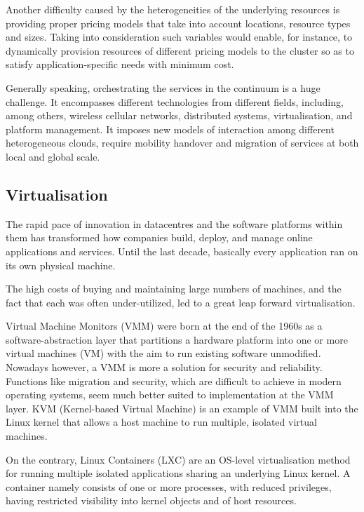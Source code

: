Another difficulty caused by the heterogeneities of the underlying resources is providing proper pricing models that take into account locations, resource types and sizes. Taking into consideration such variables would enable, for instance, to dynamically provision resources of different pricing models to the cluster so as to satisfy application-specific needs with minimum cost.

Generally speaking, orchestrating the services in the continuum is a huge challenge. It encompasses different technologies from different fields, including, among others, wireless cellular networks, distributed systems, virtualisation, and platform management. It imposes new models of interaction among different heterogeneous clouds, require mobility handover and migration of services at both local and global scale.

\subsection{Virtualisation}
\label{sec:virtualisation}

The rapid pace of innovation in datacentres and the software platforms within them has transformed how companies build, deploy, and manage online applications and services. Until the last decade, basically every application ran on its own physical machine.

The high costs of buying and maintaining large numbers of machines, and the fact that each was often under-utilized, led to a great leap forward virtualisation.

Virtual Machine Monitors (VMM) \cite{vmm} were born at the end of the 1960s as a software-abstraction layer that partitions a hardware platform into one or more virtual machines (VM) with the aim to run existing software unmodified. Nowadays however, a VMM is more a solution for security and reliability. Functions like migration and security, which are difficult to achieve in modern operating systems, seem much better suited to implementation at the VMM layer. KVM (Kernel-based Virtual Machine) \cite{kvm} is an example of VMM built into the Linux kernel that allows a host machine to run multiple, isolated virtual machines. 

On the contrary, Linux Containers (LXC) \cite{containers} are an OS-level virtualisation method for running multiple isolated applications sharing an underlying Linux kernel. A container namely consists of one or more processes, with reduced privileges, having restricted visibility into kernel objects and of host resources.

